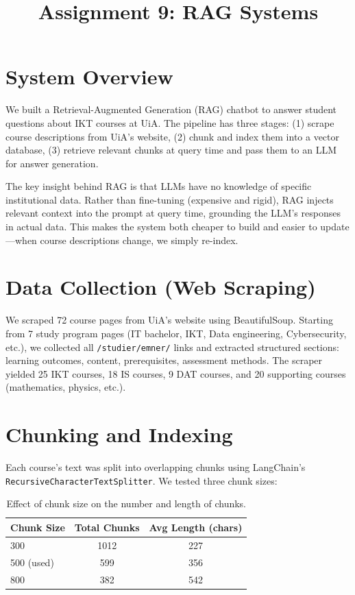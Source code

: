 \documentclass[11pt,a4paper]{article}
\title{Assignment 9: RAG Systems}
\author{}
\date{}
\begin{document}
\maketitle
\vspace{-1.5cm}

\section{System Overview}

We built a Retrieval-Augmented Generation (RAG) chatbot to answer student questions about IKT courses at UiA. The pipeline has three stages: (1) scrape course descriptions from UiA's website, (2) chunk and index them into a vector database, (3) retrieve relevant chunks at query time and pass them to an LLM for answer generation.

The key insight behind RAG is that LLMs have no knowledge of specific institutional data. Rather than fine-tuning (expensive and rigid), RAG injects relevant context into the prompt at query time, grounding the LLM's responses in actual data. This makes the system both cheaper to build and easier to update---when course descriptions change, we simply re-index.

\section{Data Collection (Web Scraping)}

We scraped 72 course pages from UiA's website using BeautifulSoup. Starting from 7 study program pages (IT bachelor, IKT, Data engineering, Cybersecurity, etc.), we collected all \texttt{/studier/emner/} links and extracted structured sections: learning outcomes, content, prerequisites, assessment methods. The scraper yielded 25 IKT courses, 18 IS courses, 9 DAT courses, and 20 supporting courses (mathematics, physics, etc.).

\section{Chunking and Indexing}

Each course's text was split into overlapping chunks using LangChain's \texttt{RecursiveCharacterTextSplitter}. We tested three chunk sizes:

\begin{table}[H]
\centering
\begin{tabular}{lcc}
\toprule
Chunk Size & Total Chunks & Avg Length (chars) \\
\midrule
300 & 1012 & 227 \\
500 (used) & 599 & 356 \\
800 & 382 & 542 \\
\bottomrule
\end{tabular}
\caption{Effect of chunk size on the number and length of chunks.}
\end{table}
\end{document}
